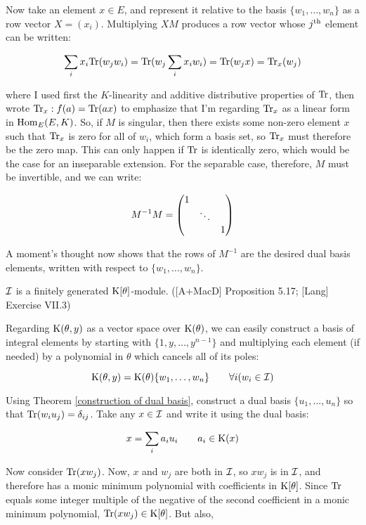 Now take an element $x \in E$, and represent it relative to the basis
$\{w_1,\ldots,w_n\}$ as a row vector $X = (x_i)$.  Multiplying $X M$
produces a row vector whose $j^{\rm th}$ element can be written:

$$\sum_i x_i {\rm Tr}(w_j w_i) = {\rm Tr}(w_j \sum_i x_i w_i) = {\rm Tr}(w_j x) = {\rm Tr}_x(w_j)$$

where I used first the $K$-linearity and additive distributive
properties of ${\rm Tr}$, then wrote ${\rm Tr}_x: f(a) = {\rm Tr}(ax)$
to emphasize that I'm regarding ${\rm Tr}_x$ as a linear form in ${\rm
Hom}_E(E,K)$.  So, if $M$ is singular, then there exists some non-zero
element $x$ such that ${\rm Tr}_x$ is zero for all of $w_i$, which
form a basis set, so ${\rm Tr}_x$ must therefore be the zero map.
This can only happen if ${\rm Tr}$ is identically zero, which would be
the case for an inseparable extension.  For the separable case,
therefore, $M$ must be invertible, and we can write:

$$M^{-1} M = \begin{pmatrix}1 & & \cr & \ddots & \cr & & 1\end{pmatrix}$$

A moment's thought now shows that the rows of $M^{-1}$ are the desired
dual basis elements, written with respect to $\{w_1,\ldots,w_n\}$.

\endtheorem


\theorem
\label{I is finitely generated}

${\cal I}$ is a finitely generated ${\rm K}[\theta]$-module.
([A+MacD] Proposition 5.17; [Lang] Exercise VII.3)

\proof

Regarding ${\rm K}(\theta,y)$ as a vector space over ${\rm
K}(\theta)$, we can easily construct a basis of integral elements by
starting with $\{1, y, \ldots, y^{n-1}\}$ and multiplying each element
(if needed) by a polynomial in $\theta$ which cancels all of its poles:

$${\rm K}(\theta,y) = {\rm K}(\theta)\{w_1,\ldots,w_n\} \qquad \forall i(w_i \in {\cal I})$$

Using Theorem \ref{construction of dual basis}, construct a dual basis
$\{u_1,\ldots,u_n\}$ so that ${\rm Tr}(w_i u_j) = \delta_{ij}$.  Take
any $x \in {\cal I}$ and write it using the dual basis:

$$x = \sum_i a_i u_i \qquad a_i \in {\rm K}(x)$$

Now consider ${\rm Tr}(x w_j)$.  Now, $x$ and $w_j$ are both in ${\cal
I}$, so $x w_j$ is in ${\cal I}$, and therefore has a monic minimum
polynomial with coefficients in ${\rm K}[\theta]$.  Since ${\rm Tr}$ equals
some integer multiple of the negative of the second coefficient in a
monic minimum polynomial, ${\rm Tr}(x w_j) \in {\rm K}[\theta]$.  But also,


